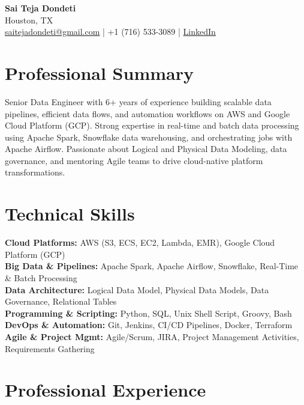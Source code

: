 \documentclass[10pt]{article}
\begin{document}
\begin{center}
    {\LARGE \textbf{Sai Teja Dondeti}} \\
    \vspace{2pt}
    Houston, TX \\
    \href{mailto:saitejadondeti@gmail.com}{saitejadondeti@gmail.com} \;|\;
    +1 (716) 533-3089 \;|\;
    \href{https://www.linkedin.com/in/sai-teja-dondeti/}{LinkedIn}
\end{center}

\section*{Professional Summary}
Senior Data Engineer with 6+ years of experience building scalable data pipelines, efficient data flows, and automation workflows on AWS and Google Cloud Platform (GCP). Strong expertise in real-time and batch data processing using Apache Spark, Snowflake data warehousing, and orchestrating jobs with Apache Airflow. Passionate about Logical and Physical Data Modeling, data governance, and mentoring Agile teams to drive cloud-native platform transformations.

\section*{Technical Skills}

\textbf{Cloud Platforms:} AWS (S3, ECS, EC2, Lambda, EMR), Google Cloud Platform (GCP) \\
\textbf{Big Data \& Pipelines:} Apache Spark, Apache Airflow, Snowflake, Real-Time \& Batch Processing \\
\textbf{Data Architecture:} Logical Data Model, Physical Data Models, Data Governance, Relational Tables \\
\textbf{Programming \& Scripting:} Python, SQL, Unix Shell Script, Groovy, Bash \\
\textbf{DevOps \& Automation:} Git, Jenkins, CI/CD Pipelines, Docker, Terraform \\
\textbf{Agile \& Project Mgmt:} Agile/Scrum, JIRA, Project Management Activities, Requirements Gathering

\section*{Professional Experience}
\end{document}
